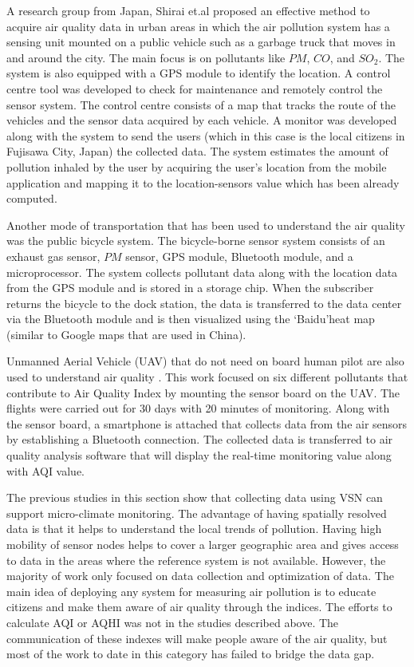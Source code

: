 A research group from Japan, Shirai et.al \cite{Shirai2016} proposed an effective method to acquire air quality data in urban areas in which the air pollution system has a sensing unit mounted on a public vehicle such as a garbage truck that moves in and around the city. The main focus is on pollutants like $PM$, $CO$, and $SO_2$. The system is also equipped with a GPS module to identify the location. A control centre tool was developed to check for maintenance and remotely control the sensor system. The control centre consists of a map that tracks the route of the vehicles and the sensor data acquired by each vehicle. A monitor was developed along with the system to send the users (which in this case is the local citizens in Fujisawa City, Japan) the collected data. The system estimates the amount of pollution inhaled by the user by acquiring the user's location from the mobile application and mapping it to the location-sensors value which has been already computed.

Another mode of transportation that has been used to understand the air quality was the public bicycle system. The bicycle-borne sensor \cite{Xiang2016, Liu2015a} system consists of an exhaust gas sensor, $PM$ sensor, GPS module, Bluetooth module, and a microprocessor. The system collects pollutant data along with the location data from the GPS module and is stored in a storage chip. When the subscriber returns the bicycle to the dock station, the data is transferred to the data center via the Bluetooth module and is then visualized using the \lq{Baidu}\rq heat map (similar to Google maps that are used in China).


 Unmanned Aerial Vehicle (UAV)  that do not need on board human pilot are also used to understand air quality \cite{Zhi2017}. This work focused on six different pollutants that contribute to Air Quality Index by mounting the sensor board on the UAV. The flights were carried out for 30 days with 20 minutes of monitoring. Along with the sensor board, a smartphone is attached that collects data from the air sensors by establishing a Bluetooth connection. The collected data is transferred to air quality analysis software that will display the real-time monitoring value along with AQI value. 

The previous studies in this section show that collecting data using VSN can support micro-climate monitoring. The advantage of having spatially resolved data is that it helps to understand the local trends of pollution. Having high mobility of sensor nodes helps to cover a larger geographic area and gives access to data in the areas where the reference system is not available. However, the majority of work only focused on data collection and optimization of data. The main idea of deploying any system for measuring air pollution is to educate citizens and make them aware of air quality through the indices. The efforts to calculate AQI or AQHI was not in the studies described above. The communication of these indexes will make people aware of the air quality, but most of the work to date in this category has failed to bridge the data gap.



